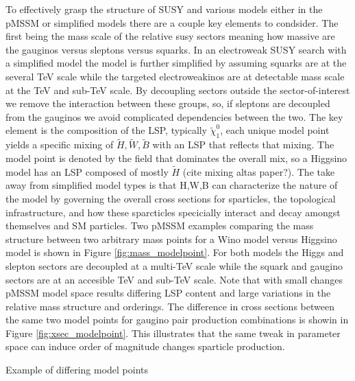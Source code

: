To effectively grasp the structure of SUSY and various models either in the pMSSM or simplified models there are a couple key elements to condsider. The first being the mass scale of the relative susy sectors meaning how massive are the gauginos versus sleptons versus squarks. In an electroweak SUSY search with a simplified model the model is further simplified by assuming squarks are at the several TeV scale while the targeted electroweakinos are at detectable mass scale at the TeV and sub-TeV scale.  By decoupling sectors outside the sector-of-interest we remove the interaction between these groups, so, if sleptons are decoupled from the gauginos we avoid complicated dependencies between the two. The key element is the composition of the LSP, typically $\tilde{\chi}^0_1$, each unique model point yields a specific mixing of $\tilde{H},\tilde{W},\tilde{B}$ with an LSP that reflects that mixing. The model point is denoted by the field that dominates the overall mix, so a Higgsino model has an LSP composed of mostly $\tilde{H}$ (cite mixing altas paper?). The take away from simplified model types is that H,W,B  can characterize the nature of the model by governing the overall cross sections for sparticles, the topological infrastructure, and how these sparcticles specicially interact and decay amongst themselves and SM particles. Two pMSSM examples comparing the mass structure between two arbitrary mass points for a Wino model versus Higgsino model is shown in Figure \ref{fig:mass_modelpoint}. For both models the Higgs and slepton sectors are decoupled at a multi-TeV scale while the squark and gaugino sectors are at an accesible TeV and sub-TeV scale. Note that with small changes pMSSM model space results differing LSP content and large variations in the relative mass structure and orderings. The difference in cross sections between the same two model points for gaugino pair production combinations is showin in Figure \ref{fig:xsec_modelpoint}. This illustrates that the same tweak in parameter space can induce order of magnitude changes sparticle production.



Example of differing model points


